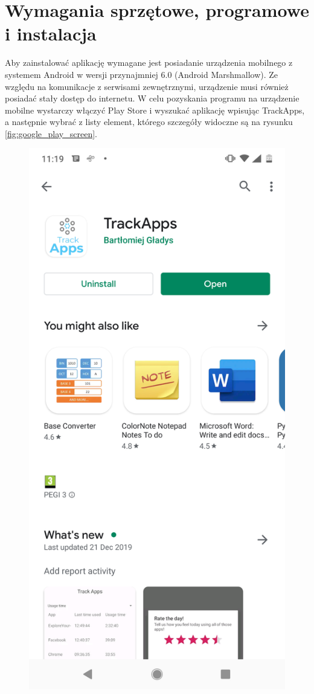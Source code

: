 \documentclass[a4paper,twoside,12pt]{book}
\begin{document}
\section{Wymagania sprzętowe, programowe i instalacja}

Aby zainstalować aplikację wymagane jest posiadanie urządzenia mobilnego z systemem Android w wersji przynajmniej 6.0 (Android Marshmallow). Ze względu na komunikacje z serwisami zewnętrznymi, urządzenie musi również posiadać stały dostęp do internetu. W celu pozyskania programu na urządzenie mobilne wystarczy włączyć Play Store i wyszukać aplikację wpisując TrackApps, a następnie wybrać z listy element, którego szczegóły widoczne są na rysunku
\ref{fig:google_play_screen}.

\begin{figure}[h!]
    \centering
    \includegraphics[scale=0.2]{images/google_play_screen.png}

\end{figure}
\end{document}
